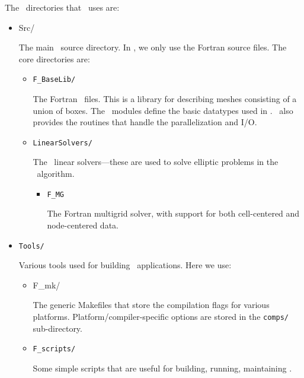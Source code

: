 The \boxlib\ directories that \maestro\ uses are:
\begin{itemize}
\item {Src/}

  The main \boxlib\ source directory.  In \maestro, we only use the
  Fortran source files.  The core directories are:

  \begin{itemize}

  \item {\tt F\_BaseLib/} 

    The Fortran \boxlib\ files.  This is a library for describing
    meshes consisting of a union of boxes.  The \boxlib\ modules
    define the basic datatypes used in \maestro.  \boxlib\ also
    provides the routines that handle the parallelization and I/O.

  \item {\tt LinearSolvers/}

    The \boxlib\ linear solvers---these are used to solve elliptic
    problems in the \maestro\ algorithm.

    \begin{itemize}

    \item {\tt F\_MG}

      The Fortran multigrid solver, with support for both
      cell-centered and node-centered data.

    \end{itemize}

  \end{itemize}

\item {\tt Tools/}

  Various tools used for building \boxlib\ applications.  Here we use:

  \begin{itemize}

  \item {F\_mk/}

    The generic Makefiles that store the compilation flags for various
    platforms.  Platform/compiler-specific options are stored in the
    {\tt comps/} sub-directory.

  \item {\tt F\_scripts/}

    Some simple scripts that are useful for building, running,
    maintaining \maestro.

  \end{itemize}

\end{itemize}






